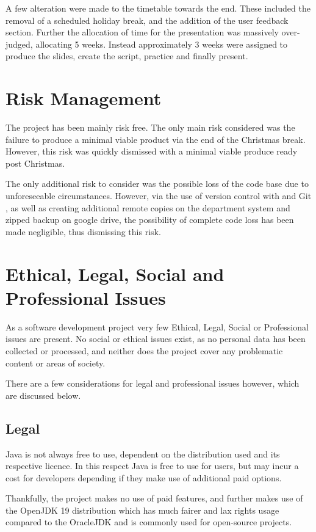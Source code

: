 A few alteration were made to the timetable towards the end. These included the removal of a scheduled holiday break, and the addition of the user feedback section. Further the allocation of time for the presentation was massively over-judged, allocating 5 weeks. Instead approximately 3 weeks were assigned to produce the slides, create the script, practice and finally present.

\section{Risk Management}
The project has been mainly risk free. The only main risk considered was the failure to produce a minimal viable product via the end of the Christmas break. However, this risk was quickly dismissed with a minimal viable produce ready post Christmas.

The only additional risk to consider was the possible loss of the code base due to unforeseeable circumstances. However, via the use of version control with \cite{github_2013_build} and Git \cite{git_2022_git}, as well as creating additional remote copies on the department system and zipped backup on google drive, the possibility of complete code loss has been made negligible, thus dismissing this risk.

\section{Ethical, Legal, Social and Professional Issues}
As a software development project very few Ethical, Legal, Social or Professional issues are present. No social or ethical issues exist, as no personal data has been collected or processed, and neither does the project cover any problematic content or areas of society.

There are a few considerations for legal and professional issues however, which are discussed below.

\subsection{Legal}
Java is not always free to use, dependent on the distribution used and its respective licence. In this respect Java is free to use for users, but may incur a cost for developers depending if they make use of additional paid options.

Thankfully, the project makes no use of paid features, and further makes use of the OpenJDK 19 \cite{oraclecorporation_2022_openjdk} distribution which has much fairer and lax rights usage compared to the OracleJDK and is commonly used for open-source projects.

